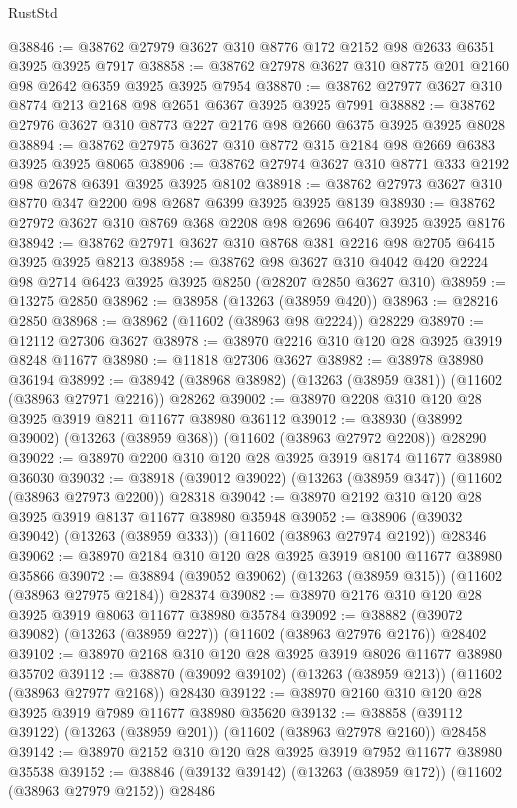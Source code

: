 \begin{lexlean}{RustStd}
\begin{coremodule}
@38846 := @38762 @27979 @3627 @310 @8776 @172 @2152 @98 @2633 @6351 @3925 @3925 @7917
@38858 := @38762 @27978 @3627 @310 @8775 @201 @2160 @98 @2642 @6359 @3925 @3925 @7954
@38870 := @38762 @27977 @3627 @310 @8774 @213 @2168 @98 @2651 @6367 @3925 @3925 @7991
@38882 := @38762 @27976 @3627 @310 @8773 @227 @2176 @98 @2660 @6375 @3925 @3925 @8028
@38894 := @38762 @27975 @3627 @310 @8772 @315 @2184 @98 @2669 @6383 @3925 @3925 @8065
@38906 := @38762 @27974 @3627 @310 @8771 @333 @2192 @98 @2678 @6391 @3925 @3925 @8102
@38918 := @38762 @27973 @3627 @310 @8770 @347 @2200 @98 @2687 @6399 @3925 @3925 @8139
@38930 := @38762 @27972 @3627 @310 @8769 @368 @2208 @98 @2696 @6407 @3925 @3925 @8176
@38942 := @38762 @27971 @3627 @310 @8768 @381 @2216 @98 @2705 @6415 @3925 @3925 @8213
@38958 := @38762
    @98
    @3627
    @310
    @4042
    @420
    @2224
    @98
    @2714
    @6423
    @3925
    @3925
    @8250
    (@28207 @2850 @3627 @310)
@38959 := @13275 @2850
@38962 := @38958 (@13263 (@38959 @420))
@38963 := @28216 @2850
@38968 := @38962 (@11602 (@38963 @98 @2224)) @28229
@38970 := @12112 @27306 @3627
@38978 := @38970 @2216 @310 @120 @28 @3925 @3919 @8248 @11677
@38980 := @11818 @27306 @3627
@38982 := @38978 @38980 @36194
@38992 := @38942 (@38968 @38982) (@13263 (@38959 @381)) (@11602 (@38963 @27971 @2216)) @28262
@39002 := @38970 @2208 @310 @120 @28 @3925 @3919 @8211 @11677 @38980 @36112
@39012 := @38930 (@38992 @39002) (@13263 (@38959 @368)) (@11602 (@38963 @27972 @2208)) @28290
@39022 := @38970 @2200 @310 @120 @28 @3925 @3919 @8174 @11677 @38980 @36030
@39032 := @38918 (@39012 @39022) (@13263 (@38959 @347)) (@11602 (@38963 @27973 @2200)) @28318
@39042 := @38970 @2192 @310 @120 @28 @3925 @3919 @8137 @11677 @38980 @35948
@39052 := @38906 (@39032 @39042) (@13263 (@38959 @333)) (@11602 (@38963 @27974 @2192)) @28346
@39062 := @38970 @2184 @310 @120 @28 @3925 @3919 @8100 @11677 @38980 @35866
@39072 := @38894 (@39052 @39062) (@13263 (@38959 @315)) (@11602 (@38963 @27975 @2184)) @28374
@39082 := @38970 @2176 @310 @120 @28 @3925 @3919 @8063 @11677 @38980 @35784
@39092 := @38882 (@39072 @39082) (@13263 (@38959 @227)) (@11602 (@38963 @27976 @2176)) @28402
@39102 := @38970 @2168 @310 @120 @28 @3925 @3919 @8026 @11677 @38980 @35702
@39112 := @38870 (@39092 @39102) (@13263 (@38959 @213)) (@11602 (@38963 @27977 @2168)) @28430
@39122 := @38970 @2160 @310 @120 @28 @3925 @3919 @7989 @11677 @38980 @35620
@39132 := @38858 (@39112 @39122) (@13263 (@38959 @201)) (@11602 (@38963 @27978 @2160)) @28458
@39142 := @38970 @2152 @310 @120 @28 @3925 @3919 @7952 @11677 @38980 @35538
@39152 := @38846 (@39132 @39142) (@13263 (@38959 @172)) (@11602 (@38963 @27979 @2152)) @28486

\end{coremodule}
\end{lexlean}
